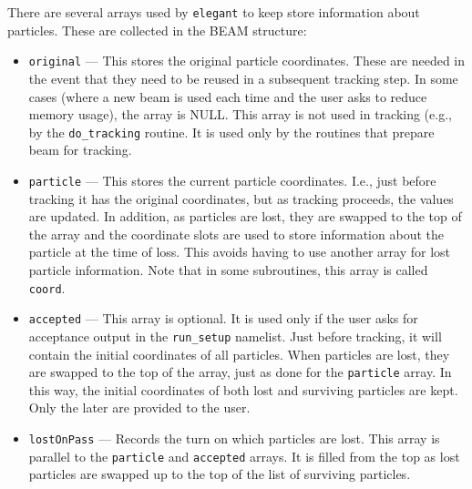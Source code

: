 \documentclass[11pt]{article}
\begin{document}
There are several arrays used by {\tt elegant} to keep store information about
particles.  These are collected in the BEAM structure:
\begin{itemize}
  \item {\tt original} --- This stores the original particle coordinates.  These are
    needed in the event that they need to be reused in a subsequent tracking step.
    In some cases (where a new beam is used each time and the user asks to reduce
    memory usage), the array is NULL.  This array is not used in tracking (e.g.,
    by the {\tt do\_tracking} routine.  It is used only by the routines that
    prepare beam for tracking.
  \item {\tt particle} --- This stores the current particle coordinates.  I.e.,
    just before tracking it has the original coordinates, but as tracking proceeds,
    the values are updated. In addition, as particles are lost, they are swapped
    to the top of the array and the coordinate slots are used to store information
    about the particle at the time of loss.   This avoids having to use another
    array for lost particle information.  Note that in some subroutines, this array
    is called {\tt coord}.
  \item {\tt accepted} --- This array is optional.  It is used only if the user asks
    for acceptance output in the {\tt run\_setup} namelist.  Just before tracking,
    it will contain the initial coordinates of all particles.  When particles are
    lost, they are swapped to the top of the array, just as done for the {\tt particle}
    array.  In this way, the initial coordinates of both lost and surviving particles
    are kept.  Only the later are provided to the user.
  \item {\tt lostOnPass} --- Records the turn on which particles are lost.  This array
    is parallel to the {\tt particle} and  {\tt accepted} arrays.  It is filled from
    the top as lost particles are swapped up to the top of the list of surviving particles.
\end{itemize}
\end{document}
